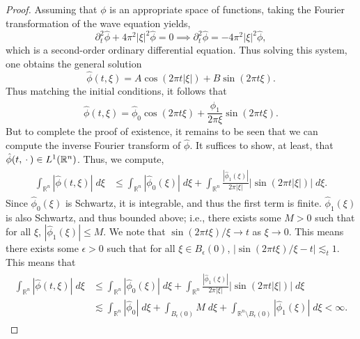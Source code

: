 \documentclass{article}
\begin{document}
\begin{proof}
 Assuming that $\phi$ is an appropriate space of functions, taking the Fourier transformation of the wave equation yields, 
\begin{equation*}
	\partial_{t}^{2}\hat{\phi} + 4\pi^{2}|\xi|^{2}\hat{\phi} = 0 \implies \partial_{t}^{2}\hat{\phi} = -4\pi^{2}|\xi|^{2}\hat{\phi}, 
\end{equation*} 
which is a second-order ordinary differential equation. Thus solving this system, one obtains the general solution 
\begin{equation*}
	\hat{\phi}(t, \xi) = A\cos(2\pi t|\xi|) + B\sin(2\pi t \xi). 
\end{equation*}
Thus matching the initial conditions, it follows that 
\begin{equation*}
	\hat{\phi}(t, \xi) = \hat{\phi}_{0}\cos(2\pi t \xi) + \frac{\hat{\phi}_{1}}{2\pi  \xi}\sin(2\pi t \xi). 
\end{equation*}
But to complete the proof of existence, it remains to be seen that we can compute the inverse Fourier transform of $\hat{\phi}$. It suffices to show, at least, that $\hat{\phi}(t, \hspace{2pt}\cdot\hspace{2pt}) \in L^{1}(\mathbb{R}^{n})$. Thus, we compute, 
\begin{align*}
	\begin{split}
		\int_{\mathbb{R}^{n}}|\hat{\phi}(t, \xi)|\;d\xi &\leq \int_{\mathbb{R}^{n}}|\hat{\phi}_{0}(\xi)|\;d\xi + \int_{\mathbb{R}^{n}}\frac{|\hat{\phi}_{1}(\xi)|}{2\pi |\xi|}|\sin(2\pi t |\xi|)|\;d\xi. 
	\end{split}
\end{align*}
Since $\hat{\phi}_{0}(\xi)$ is Schwartz, it is integrable, and thus the first term is finite. $\hat{\phi}_{1}(\xi)$ is also Schwartz, and thus bounded above; i.e., there exists some $M > 0$ such that for all $\xi$, $|\hat{\phi}_{1}(\xi)| \leq M$. We note that $\sin(2\pi t \xi)/\xi \to t$ as $\xi \to 0$. This means there exists some $\epsilon > 0$ such that for all $\xi \in B_{\epsilon}(0)$, $|\sin(2\pi t \xi)/\xi - t| \lesssim_{t} 1$. This means that 
\begin{align*}
	\begin{split}
		\int_{\mathbb{R}^{n}}|\hat{\phi}(t, \xi)|\;d\xi &\leq \int_{\mathbb{R}^{n}}|\hat{\phi}_{0}(\xi)|\;d\xi + \int_{\mathbb{R}^{n}}\frac{|\hat{\phi}_{1}(\xi)|}{2\pi |\xi|}|\sin(2\pi t |\xi|)|\;d\xi \\
		&\lesssim \int_{\mathbb{R}^{n}}|\hat{\phi}_{0}|\;d\xi + \int_{B_{\epsilon}(0)}M\;d\xi + \int_{\mathbb{R}^{n}\setminus B_{\epsilon}(0)}|\hat{\phi}_{1}(\xi)|\;d\xi < \infty.  

\end{split}
\end{align*}
\end{proof}
\end{document}
